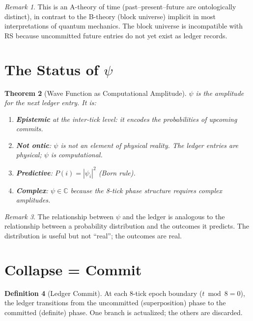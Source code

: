 \documentclass[12pt,a4paper]{article}
\newtheorem{theorem}{Theorem}[section]
\theoremstyle{definition}
\newtheorem{definition}[theorem]{Definition}
\theoremstyle{remark}
\newtheorem{remark}[theorem]{Remark}
\begin{document}
\begin{remark}
This is an A-theory of time (past--present--future are
ontologically distinct), in contrast to the B-theory (block
universe) implicit in most interpretations of quantum mechanics.
The block universe is incompatible with RS because uncommitted
future entries do not yet exist as ledger records.
\end{remark}

\section{The Status of $\psi$}
\label{sec:psi}

\begin{theorem}[Wave Function as Computational Amplitude]
\label{thm:psi}
$\psi$ is the amplitude for the next ledger entry.  It is:
\begin{enumerate}[label=(\roman*)]
  \item \textbf{Epistemic} at the inter-tick level: it encodes
  the probabilities of upcoming commits.
  \item \textbf{Not ontic}: $\psi$ is not an element of physical
  reality.  The ledger entries are physical; $\psi$ is
  computational.
  \item \textbf{Predictive}: $P(i) = |\psi_i|^2$ (Born rule).
  \item \textbf{Complex}: $\psi \in \mathbb{C}$ because the
  8-tick phase structure requires complex amplitudes.
\end{enumerate}
\end{theorem}

\begin{remark}
The relationship between $\psi$ and the ledger is analogous to
the relationship between a probability distribution and the
outcomes it predicts.  The distribution is useful but not
``real''; the outcomes are real.
\end{remark}

\section{Collapse = Commit}
\label{sec:collapse}

\begin{definition}[Ledger Commit]
At each 8-tick epoch boundary ($t \bmod 8 = 0$), the ledger
transitions from the uncommitted (superposition) phase to the
committed (definite) phase.  One branch is actualized; the others
are discarded.
\end{definition}
\end{document}
